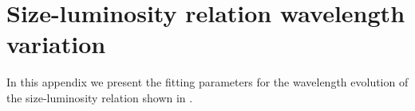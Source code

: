 

\section{Size-luminosity relation wavelength variation}

In this appendix we present the fitting parameters for the wavelength evolution of the size-luminosity relation shown in .

\label{sec:bandtable}

